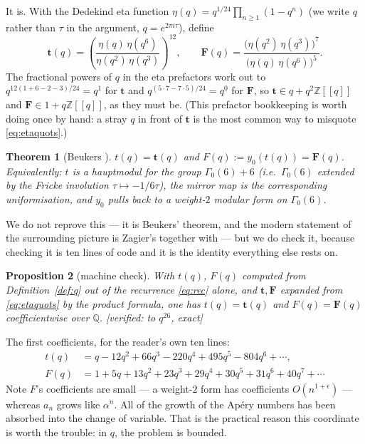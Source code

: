 \documentclass[11pt,reqno]{amsart}
\theoremstyle{plain}
\newtheorem{theorem}{Theorem}[section]
\newtheorem{proposition}[theorem]{Proposition}
\theoremstyle{definition}
\theoremstyle{remark}
\newcommand{\Z}{\mathbb{Z}}
\newcommand{\Q}{\mathbb{Q}}
\newcommand{\Ver}[1]{\textup{\textsf{[verified: #1]}}}
\numberwithin{equation}{section}
\begin{document}
It is. With the Dedekind eta function
$\eta(q)=q^{1/24}\prod_{n\ge1}(1-q^n)$ (we write $q$ rather than $\tau$ in the
argument, $q=e^{2\pi i\tau}$), define
\begin{equation}\label{eq:etaquots}
  \mathbf{t}(q)=\left(\frac{\eta(q)\,\eta(q^{6})}
                           {\eta(q^{2})\,\eta(q^{3})}\right)^{\!12},
  \qquad
  \mathbf{F}(q)=\frac{\bigl(\eta(q^{2})\,\eta(q^{3})\bigr)^{7}}
                     {\bigl(\eta(q)\,\eta(q^{6})\bigr)^{5}} .
\end{equation}
The fractional powers of $q$ in the eta prefactors work out to
$q^{12(1+6-2-3)/24}=q^{1}$ for $\mathbf t$ and $q^{(5\cdot7-7\cdot5)/24}=q^{0}$
for $\mathbf F$, so $\mathbf t\in q+q^2\Z[[q]]$ and $\mathbf F\in1+q\Z[[q]]$,
as they must be. (This prefactor bookkeeping is worth doing once by hand: a
stray $q$ in front of $\mathbf t$ is the most common way to misquote
\eqref{eq:etaquots}.)

\begin{theorem}[Beukers \cite{Beukers87}]\label{thm:beukers}
$t(q)=\mathbf t(q)$ and $F(q):=y_0(t(q))=\mathbf F(q)$. Equivalently: $t$ is a
hauptmodul for the group $\Gamma_0(6)+6$ (i.e.\ $\Gamma_0(6)$ extended by the
Fricke involution $\tau\mapsto-1/6\tau$), the mirror map is the corresponding
uniformisation, and $y_0$ pulls back to a weight-$2$ modular form on
$\Gamma_0(6)$.
\end{theorem}

We do not reprove this --- it is Beukers' theorem, and the modern statement of
the surrounding picture is Zagier's \cite{Zagier09} together with
\cite{ASZ,Golyshev} --- but we do check it, because checking it is ten lines of
code and it is the identity everything else rests on.

\begin{proposition}[machine check]\label{prop:check}
With $t(q)$, $F(q)$ computed from Definition~\ref{def:q} out of the recurrence
\eqref{eq:rec} alone, and $\mathbf t,\mathbf F$ expanded from
\eqref{eq:etaquots} by the product formula, one has
$t(q)=\mathbf t(q)$ and $F(q)=\mathbf F(q)$ coefficientwise over $\Q$.
\Ver{to $q^{26}$, exact}
\end{proposition}

The first coefficients, for the reader's own ten lines:
\begin{align}
  t(q)&=q-12q^2+66q^3-220q^4+495q^5-804q^6+\cdots,\label{eq:tq2}\\
  F(q)&=1+5q+13q^2+23q^3+29q^4+30q^5+31q^6+40q^7+\cdots\label{eq:Fq}
\end{align}
Note $F$'s coefficients are small --- a weight-$2$ form has coefficients
$O(n^{1+\epsilon})$ --- whereas $a_n$ grows like $\alpha^n$. All of the growth
of the Ap\'ery numbers has been absorbed into the change of variable. That is
the practical reason this coordinate is worth the trouble: in $q$, the problem
is bounded.
\end{document}
